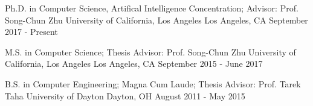 


\begin{cventries}


\cventry
{Ph.D. in Computer Science, Artifical Intelligence Concentration; Advisor: Prof. Song-Chun Zhu}
{University of California, Los Angeles} %
{Los Angeles, CA} %
{September 2017 - Present} %
{ %
}
\vspace{-4mm}


\cventry
{M.S. in Computer Science; Thesis Advisor: Prof. Song-Chun Zhu}
{University of California, Los Angeles} %
{Los Angeles, CA} %
{September 2015 - June 2017} %
{ %
}
\vspace{-4mm}


\cventry
{B.S. in Computer Engineering; Magna Cum Laude; Thesis Advisor: Prof. Tarek Taha}
{University of Dayton} %
{Dayton, OH} %
{August 2011 - May 2015} %
{ %
}
\vspace{-4mm}


\end{cventries}